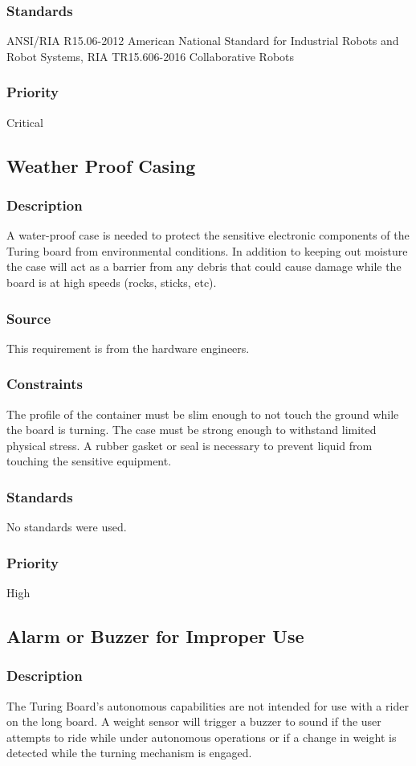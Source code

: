 \subsubsection{Standards}
ANSI/RIA R15.06-2012 American National Standard for Industrial Robots and Robot Systems, RIA TR15.606-2016 Collaborative Robots
\subsubsection{Priority}
Critical

\subsection{Weather Proof Casing}
\subsubsection{Description}
A water-proof case is needed to protect the sensitive electronic components of the Turing board from environmental conditions. In addition to keeping out moisture the case will act as a barrier from any debris that could cause damage while the board is at high speeds (rocks, sticks, etc).
\subsubsection{Source}
This requirement is from the hardware engineers.
\subsubsection{Constraints}
The profile of the container must be slim enough to not touch the ground while the board is turning. The case must be strong enough to withstand limited physical stress. A rubber gasket or seal is necessary to prevent liquid from touching the sensitive equipment.
\subsubsection{Standards}
No standards were used.
\subsubsection{Priority}
High

\subsection{Alarm or Buzzer for Improper Use}
\subsubsection{Description}
The Turing Board's autonomous capabilities are not intended for use with a rider on the long board. A weight sensor will trigger a buzzer to sound if the user attempts to ride while under autonomous operations or if a change in weight is detected while the turning mechanism is engaged.
